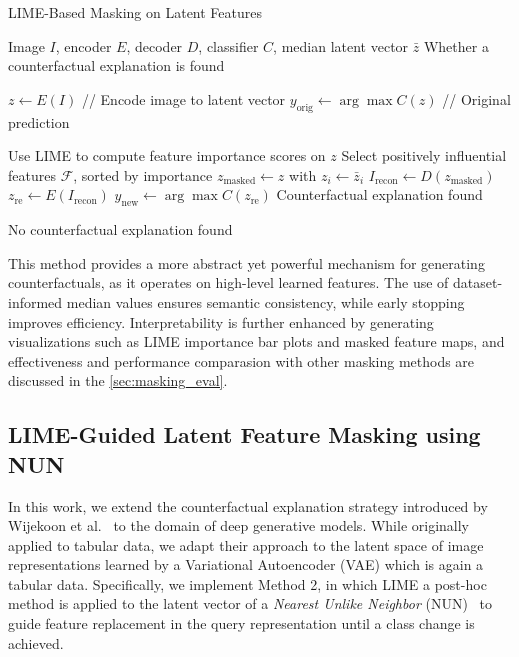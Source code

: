\vspace{1em}
\begin{algorithm}[H]
\caption{LIME-Based Masking on Latent Features}
\label{alg:lime_on_latent}
\begin{algorithmic}[1]
\REQUIRE Image $I$, encoder $E$, decoder $D$, classifier $C$, median latent vector $\bar{z}$
\ENSURE Whether a counterfactual explanation is found

\STATE $z \leftarrow E(I)$ \hfill // Encode image to latent vector
\STATE $y_{\text{orig}} \leftarrow \arg\max C(z)$ \hfill // Original prediction

\STATE Use LIME to compute feature importance scores on $z$
\STATE Select positively influential features $\mathcal{F}$, sorted by importance
    \STATE $z_{\text{masked}} \leftarrow z$ with $z_i \leftarrow \bar{z}_i$
    \STATE $I_{\text{recon}} \leftarrow D(z_{\text{masked}})$
    \STATE $z_{\text{re}} \leftarrow E(I_{\text{recon}})$
    \STATE $y_{\text{new}} \leftarrow \arg\max C(z_{\text{re}})$
        \RETURN Counterfactual explanation found
    \ENDIF
\ENDFOR

\RETURN No counterfactual explanation found
\end{algorithmic}
\end{algorithm}
\vspace{1em}

This method provides a more abstract yet powerful mechanism for generating counterfactuals, as it operates on high-level learned features. The use of dataset-informed median values ensures semantic consistency, while early stopping improves efficiency. Interpretability is further enhanced by generating visualizations such as LIME importance bar plots and masked feature maps, and effectiveness and performance comparasion with other masking methods are discussed in the \cref{sec:masking_eval}.





\subsection{LIME-Guided Latent Feature Masking using NUN} \label{lime_with_NUN}

In this work, we extend the counterfactual explanation strategy introduced by Wijekoon et al.~\cite{WijekoonWNMPC21} to the domain of deep generative models. While originally applied to tabular data, we adapt their approach to the latent space of image representations learned by a Variational Autoencoder (VAE) which is again a tabular data. Specifically, we implement Method 2, in which LIME a post-hoc method is applied to the latent vector of a \textit{Nearest Unlike Neighbor} (NUN)~\cite{DELANEY2023103995} to guide feature replacement in the query representation until a class change is achieved.

